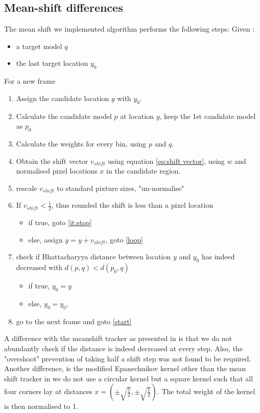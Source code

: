 \documentclass[a4paper,11pt]{article}
\begin{document}
\subsection{Mean-shift differences}
The mean shift we implemented algorithm performs the following steps:
Given : 
\begin{itemize}
\item a target model $q$
\item the last target location $y_0$
\end{itemize}
For a new frame
\begin{enumerate}
\item \label{start} Assign the candidate location $y$ with $y_0$.
\item \label{loop} Calculate the candidate model $p$ at location $y$, keep the 1st candidate model as $p_0$
\item Calculate the weights for every bin, using $p$ and $q$.
\item Obtain the shift vector $v_{shift}$ using equation \ref{eq:shift vector}, using $w$ and normalised pixel locations $x$ in the candidate region.
\item rescale $v_{shift}$ to standard pixture sizes, "un-normalise"
\item If $v_{shift} < \frac{1}{2}$, thus rounded the shift is less than a pixel location\\
\begin{itemize}
\item if true, goto \ref{it:stop}
\item else, assign $y=y+v_{shift}$, goto \ref{loop}
\end{itemize}
\item \label{it:stop} check if Bhattacharyya distance between location $y$ and $y_0$ has indeed decreased with $d(p,q) < d(p_0,q)$ 
\begin{itemize}
\item if true, $y_0 = y$
\item else, $y_0 = y_0$, 
\end{itemize}
\item go to the next frame and goto \ref{start}
\end{enumerate}

A difference with the meanshift tracker as presented in \cite{mean_shift} is that we do not abundantly check if the distance is indeed decreased at every step. Also, the "overshoot" prevention of taking half a shift step was not found to be required. Another difference, is the modified  Epanechnikov kernel other than the mean shift tracker in \cite{mean_shift} we do not use a circular kernel but a square kernel such that all four corners lay at distances $x=(\pm \sqrt{\frac{1}{2}},\pm \sqrt{\frac{1}{2}})$. The total weight of the kernel is then normalised to 1.
\end{document}
